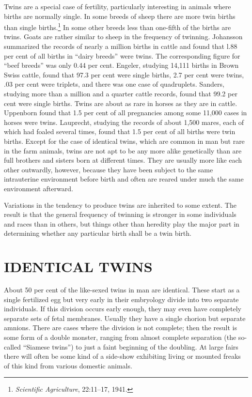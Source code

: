Twins are a special case of fertility, particularly interesting in animals
where births are normally single. In some breeds of sheep there are
more twin births than single births.\footnote{\textit{Scientific
Agriculture}, 22:11--17, 1941.} In some other breeds less than
one-fifth of the births are twins. Goats are rather similar to sheep in
the frequency of twinning. Johansson summarized the records of nearly
a million births in cattle and found that l.88 per cent of all births in
``dairy breeds'' were twins. The corresponding figure for ``beef breeds''
was only 0.44 per cent. Engeler, studying 14,111 births in Brown Swiss
cattle, found that 97.3 per cent were single births, 2.7 per cent were
twins, .03 per cent were triplets, and there was one case of quadruplets.
Sanders, studying more than a million and a quarter cattle records,
found that 99.2 per cent were single births. Twins are about as rare in
horses as they are in cattle. Uppenborn found that 1.5 per cent of all
pregnancies among some 11,000 cases in horses were twins. Lauprecht,
studying the records of about 1,500 mares, each of which had foaled several
times, found that 1.5 per cent of all births were twin births. Except
for the case of identical twins, which are common in man but rare in
the farm animals, twins are not apt to be any more alike genetically
than are full brothers and sisters born at different times. They are
usually more like each other outwardly, however, because they have
been subject to the same intrauterine environment before birth and
often are reared under much the same environment afterward.

Variations in the tendency to produce twins are inherited to some
extent. The result is that the general frequency of twinning is stronger
in some individuals and races than in others, but things other than
heredity play the major part in determining whether any particular
birth shall be a twin birth.

\section*{IDENTICAL TWINS}

About 50 per cent of the like-sexed twins in man are identical.
These start as a single fertilized egg but very early in their embryology
divide into two separate individuals. If this division occurs early
enough, they may even have completely separate sets of fetal membranes.
Usually they have a single chorion but separate amnions. There
are cases where the division is not complete; then the result is some
form of a double monster, ranging from almost complete separation
(the so-called ``Siamese twins'') to just a faint beginning of the doubling.
At large fairs there will often be some kind of a side-show exhibiting
living or mounted freaks of this kind from various domestic animals.

